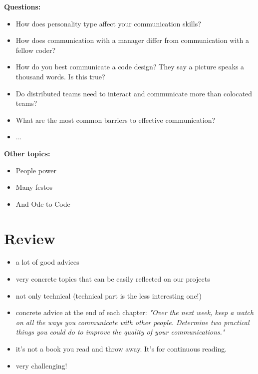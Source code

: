 \documentclass{mypresentation}
\begin{document}
\textbf{Questions:}
\begin{itemize}
\item How does personality type affect your communication skills?
\item How does communication with a manager differ from communication with a fellow coder?
\item How do you best communicate a code design? They say a picture speaks a thousand words. Is this true?
\item Do distributed teams need to interact and communicate more than colocated teams?
\item What are the most common barriers to effective communication?
\item ...
\end{itemize}
\newpage

\textbf{Other topics:}
\begin{itemize}
\item People power
\item Many-festos
\item And Ode to Code
\end{itemize}
\newpage

\section{Review}
\begin{itemize}
\item a lot of good advices
\item very concrete topics that can be easily reflected on our projects
\item not only technical (technical part is the less interesting one!)
\item concrete advice at the end of each chapter: \textit{"Over the next week, keep a watch on all the ways you communicate with other people. Determine two practical things you could do to improve the quality of your communications."}
\item it's not a book you read and throw away. It's for continuous reading.
\item very challenging!
\end{itemize}
\newpage

\end{document}
